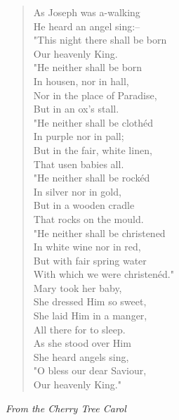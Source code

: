 
\begin{verse}
As Joseph was a-walking\\
\hspace*{2em}He heard an angel sing:--\\
"This night there shall be born\\
\hspace*{2em}Our heavenly King.\\[0.7em]

"He neither shall be born\\
\hspace*{2em}In housen, nor in hall,\\
Nor in the place of Paradise,\\
\hspace*{2em}But in an ox's stall.\\[0.7em]

"He neither shall be clothéd\\
\hspace*{2em}In purple nor in pall;\\
But in the fair, white linen,\\
\hspace*{2em}That usen babies all.\\[0.7em]

"He neither shall be rockéd\\
\hspace*{2em}In silver nor in gold,\\
But in a wooden cradle\\
\hspace*{2em}That rocks on the mould.\\[0.7em]

"He neither shall be christened\\
\hspace*{2em}In white wine nor in red,\\
But with fair spring water\\
\hspace*{2em}With which we were christenéd."\\[0.7em]

Mary took her baby,\\
\hspace*{2em}She dressed Him so sweet,\\
She laid Him in a manger,\\
\hspace*{2em}All there for to sleep.\\[0.7em]

As she stood over Him\\
\hspace*{2em}She heard angels sing,\\
"O bless our dear Saviour,\\
\hspace*{2em}Our heavenly King."%
\end{verse}

\vspace{0.5\baselineskip}
\noindent\textit{From the Cherry Tree Carol}

\newpage

